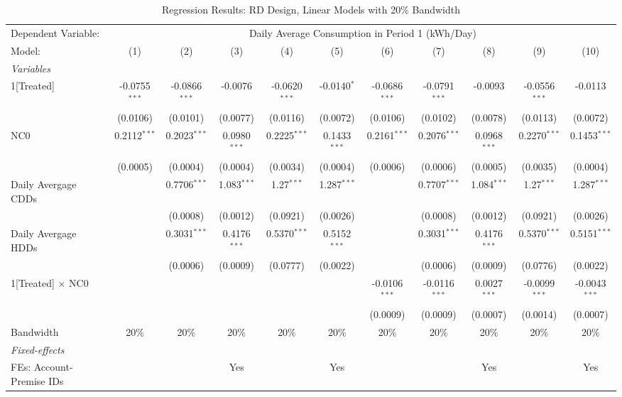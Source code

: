 \begin{table}[htbp]
\centering
\caption{\label{Table:Regression-Results_RD_Linear_BW-20} Regression Results: RD Design, Linear Models with 20\% Bandwidth}
\begin{tabular}{lcccccccccc}
\tabularnewline\toprule\toprule
Dependent Variable:&\multicolumn{10}{c}{Daily Average Consumption in Period 1 (kWh/Day)}\\
Model:&(1) & (2) & (3) & (4) & (5) & (6) & (7) & (8) & (9) & (10)\\
\midrule
\emph{Variables}&   &   &   &   &   &   &   &   &   &  \\
1[Treated]&-0.0755$^{***}$ & -0.0866$^{***}$ & -0.0076 & -0.0620$^{***}$ & -0.0140$^{*}$ & -0.0686$^{***}$ & -0.0791$^{***}$ & -0.0093 & -0.0556$^{***}$ & -0.0113\\
  &(0.0106) & (0.0101) & (0.0077) & (0.0116) & (0.0072) & (0.0106) & (0.0102) & (0.0078) & (0.0113) & (0.0072)\\
NC0&0.2112$^{***}$ & 0.2023$^{***}$ & 0.0980$^{***}$ & 0.2225$^{***}$ & 0.1433$^{***}$ & 0.2161$^{***}$ & 0.2076$^{***}$ & 0.0968$^{***}$ & 0.2270$^{***}$ & 0.1453$^{***}$\\
  &(0.0005) & (0.0004) & (0.0004) & (0.0034) & (0.0004) & (0.0006) & (0.0006) & (0.0005) & (0.0035) & (0.0004)\\
Daily Avergage CDDs&   & 0.7706$^{***}$ & 1.083$^{***}$ & 1.27$^{***}$ & 1.287$^{***}$ &    & 0.7707$^{***}$ & 1.084$^{***}$ & 1.27$^{***}$ & 1.287$^{***}$\\
  &   & (0.0008) & (0.0012) & (0.0921) & (0.0026) &    & (0.0008) & (0.0012) & (0.0921) & (0.0026)\\
Daily Avergage HDDs&   & 0.3031$^{***}$ & 0.4176$^{***}$ & 0.5370$^{***}$ & 0.5152$^{***}$ &    & 0.3031$^{***}$ & 0.4176$^{***}$ & 0.5370$^{***}$ & 0.5151$^{***}$\\
  &   & (0.0006) & (0.0009) & (0.0777) & (0.0022) &    & (0.0006) & (0.0009) & (0.0776) & (0.0022)\\
1[Treated] $\times $ NC0&   &    &    &    &    & -0.0106$^{***}$ & -0.0116$^{***}$ & 0.0027$^{***}$ & -0.0099$^{***}$ & -0.0043$^{***}$\\
  &   &    &    &    &    & (0.0009) & (0.0009) & (0.0007) & (0.0014) & (0.0007)\\
\midrule Bandwidth & 20\% & 20\% & 20\% & 20\% & 20\% & 20\% & 20\% & 20\% & 20\% & 20\%\\
\midrule
\emph{Fixed-effects}&   &   &   &   &   &   &   &   &   &  \\
FEs: Account-Premise IDs &  &  & Yes &  & Yes &  &  & Yes &  & Yes\\

\end{tabular}
\end{table}

